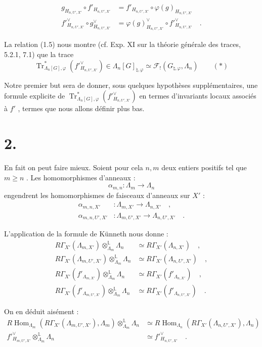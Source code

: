 \documentclass[11pt]{article}
\DeclareMathOperator{\Hom}{Hom}
\providecommand{\Tr}{\operatorname{Tr}}
\providecommand{\Tr}{\operatorname{Tr}}
\providecommand{\Tr}{\operatorname{Tr}}
\providecommand{\Hom}{\operatorname{Hom}}
\providecommand{\Tr}{\operatorname{Tr}}
\providecommand{\La}{\Lambda}
\providecommand{\Hom}{\operatorname{Hom}}
\providecommand{\Tr}{\operatorname{Tr}}
\begin{document}
\begin{align}
\tag{1.4} g_{H_{n,U',X'}} \circ f'_{H_{n,U',X'}} &= f'_{H_{n,U',X'}} \circ \varphi(g)_{H_{n,U',X'}} \\
\tag{1.5} f'^\vee_{H_{n,U',X'}} \circ g^\vee_{H_{n,U',X'}} &= \varphi(g)^\vee_{H_{n,U',X'}} \circ f'^\vee_{H_{n,U',X'}} \quad .
\end{align}

La relation (1.5) nous montre (cf. Exp. XI sur la théorie générale des traces, 5.2.1, 7.1) que la trace
\[
\Tr^*_{\La_n[G],\varphi}(f'^\vee_{H_{n,U',X'}}) \in \La_n[G]_{\natural,\varphi} \simeq \mathcal{F}_!(G_{\natural,\varphi}, \La_n) \qquad (*)
\]

Notre premier but sera de donner, sous quelques hypothèses supplémentaires, une formule explicite de $\Tr^*_{\La_n[G],\varphi}(f'^\vee_{H_{n,U',X'}})$ en termes d'invariants locaux associés à $f'$ , termes que nous allons définir plus bas.

\section*{2.}
En fait on peut faire mieux. Soient pour cela $n,m$ deux entiers positifs tel que $m \geq n$ . Les homomorphismes d'anneaux :
\[
\alpha_{m,n} : \La_m \longrightarrow \La_n
\]
engendrent les homomorphismes de faisceaux d'anneaux sur $X'$ :
\begin{align*}
\alpha_{m,n,X'} &: \La_{m,X'} \longrightarrow \La_{n,X'} \quad , \\
\alpha_{m,n,U',X'} &: \La_{m,U',X'} \longrightarrow \La_{n,U',X'} \quad .
\end{align*}

L'application de la formule de Künneth nous donne :
\begin{align}
\tag{2.1} R\Gamma_{X'}(\La_{m,X'}) \otimes_{\La_m}^{\mathbb{L}} \La_n &\simeq R\Gamma_{X'}(\La_{n,X'}) \quad , \\
\tag{2.2} R\Gamma_{X'}(\La_{m,U',X'}) \otimes_{\La_m}^{\mathbb{L}} \La_n &\simeq R\Gamma_{X'}(\La_{n,U',X'}) \quad , \\
\tag{2.3} R\Gamma_{X'}(f'_{\La_{m,X'}}) \otimes_{\La_m}^{\mathbb{L}} \La_n &\simeq R\Gamma_{X'}(f'_{\La_{n,X'}}) \quad , \\
\tag{2.4} R\Gamma_{X'}(f'_{\La_{m,U',X'}}) \otimes_{\La_m}^{\mathbb{L}} \La_n &\simeq R\Gamma_{X'}(f'_{\La_{n,U',X'}}) \quad .
\end{align}

On en déduit aisément :
\begin{align}
\tag{2.5} R\Hom_{\La_m}(R\Gamma_{X'}(\La_{m,U',X'}), \La_m) \otimes_{\La_m}^{\mathbb{L}} \La_n &\simeq R\Hom_{\La_n}(R\Gamma_{X'}(\La_{n,U',X'}), \La_n) \\
\tag{2.6} f'^\vee_{H_{m,U',X'}} \otimes_{\La_m}^{\mathbb{L}} \La_n &\simeq f'^\vee_{H_{n,U',X'}} \quad .
\end{align}
\end{document}
